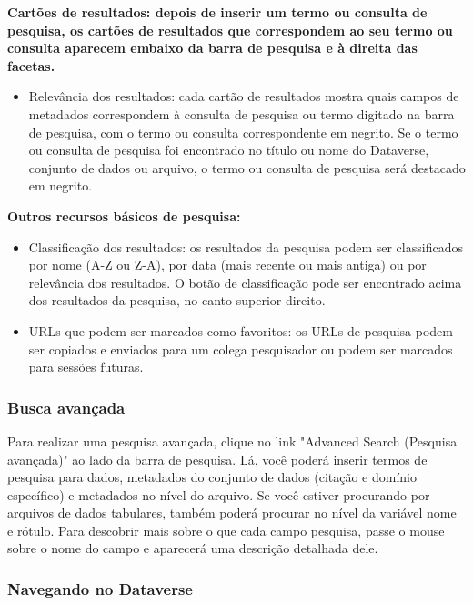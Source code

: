 \documentclass[12pt,hidelinks]{article}
\begin{document}
\textbf{Cartões de resultados: depois de inserir um termo ou consulta de pesquisa, os cartões de resultados que correspondem ao seu termo ou consulta aparecem embaixo da barra de pesquisa e à direita das facetas.}

\begin{itemize}
\item Relevância dos resultados: cada cartão de resultados mostra quais campos de metadados correspondem à consulta de pesquisa ou termo digitado na barra de pesquisa, com o termo ou consulta correspondente em negrito. Se o termo ou consulta de pesquisa foi encontrado no título ou nome do Dataverse, conjunto de dados ou arquivo, o termo ou consulta de pesquisa será destacado em negrito.
\end{itemize}

\textbf{Outros recursos básicos de pesquisa:}

\begin{itemize}
\item Classificação dos resultados: os resultados da pesquisa podem ser classificados por nome (A-Z ou Z-A), por data (mais recente ou mais antiga) ou por relevância dos resultados. O botão de classificação pode ser encontrado acima dos resultados da pesquisa, no canto superior direito.
\item URLs que podem ser marcados como favoritos: os URLs de pesquisa podem ser copiados e enviados para um colega pesquisador ou podem ser marcados para sessões futuras.
\end{itemize}
	        
	    \subsubsection{Busca avançada}
	    
\qquad Para realizar uma pesquisa avançada, clique no link "Advanced Search (Pesquisa avançada)" ao lado da barra de pesquisa. Lá, você poderá inserir termos de pesquisa para dados, metadados do conjunto de dados (citação e domínio específico) e metadados no nível do arquivo. Se você estiver procurando por arquivos de dados tabulares, também poderá procurar no nível da variável nome e rótulo. Para descobrir mais sobre o que cada campo pesquisa, passe o mouse sobre o nome do campo e aparecerá uma descrição detalhada dele.
	    
	    \subsubsection{Navegando no Dataverse}
	    
\end{document}
